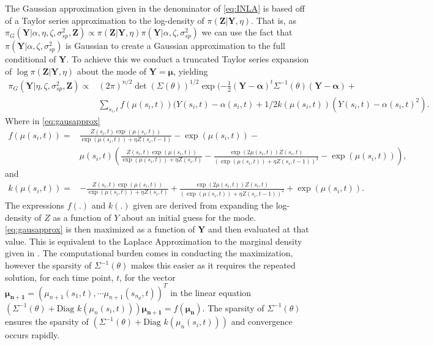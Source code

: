 \documentclass[11pt]{isuthesis}
\begin{document}
	The Gaussian approximation given in the denominator of \eqref{eq:INLA} is based off of a Taylor series approximation to the log-density of $\pi(\boldsymbol{Z}|\boldsymbol{Y},\eta)$.  That is, as $\pi_G(\boldsymbol{Y}|\alpha,\eta,\zeta,\sigma_{sp}^2,\boldsymbol{Z})\propto\pi(\boldsymbol{Z}|\boldsymbol{Y},\eta)\pi(\boldsymbol{Y}|\alpha,\zeta,\sigma_{sp}^2)$ we can use the fact that $\pi(\boldsymbol{Y}|\alpha,\zeta,\sigma_{sp}^2)$ is Gaussian to create a Gaussian approximation to the full conditional of $\boldsymbol{Y}$.  To achieve this we conduct a truncated Taylor series expansion of $\log\pi(\boldsymbol{Z}|\boldsymbol{Y},\eta)$ about the mode of $\boldsymbol{Y}=\boldsymbol{\mu}$, yielding
	\begin{align}
	\pi_G(\boldsymbol{Y}|\eta,\zeta,\sigma_{sp}^2,\boldsymbol{Z}) \propto& (2 \pi)^{n/2} \det(\Sigma(\theta))^{1/2} \exp(-\frac{1}{2}(\boldsymbol{Y}-\boldsymbol{\alpha})^t \Sigma^{-1}(\theta)(\boldsymbol{Y}-\boldsymbol{\alpha})+\nonumber \\&\sum_{s_i,t} f(\mu(s_i,t))(Y(s_i,t)-\alpha(s_i,t)+
	\label{eq:gausapprox} 1/2 k (\mu(s_i,t))(Y(s_i,t)-\alpha(s_i,t)^2).
	\end{align} 
	Where in \eqref{eq:gausapprox}
	{\small
	\begin{align}
	f(\mu(s_i,t))  =& \frac{Z(s_i,t)\exp(\mu(s_i,t))}{\exp(\mu(s_i,t))+\eta Z(s_i,t-1)}-\exp(\mu(s_i,t)) - \nonumber \\       & \mu(s_i,t)\left(\frac{Z(s_i,t)\exp(\mu(s_i,t))}{\exp(\mu(s_i,t))+\eta Z(s_i,t)}-\frac{\exp(2 \mu(s_i,t))Z(s_i,t)}{\left(\exp(\mu(s_i,t))+\eta Z(s_i,t-1)\right)^2}-\exp(\mu(s_i,t))\right),
	\end{align}
	}%
	and
	\begin{align}
	k(\mu(s_i,t)) =& -\frac{Z(s_i,t)\exp(\mu(s_i,t))}{\exp(\mu(s_i,t))+\eta Z(s_i,t)}+\frac{\exp(2 \mu(s_i,t))Z(s_i,t)}{\left(\exp(\mu(s_i,t))+\eta Z(s_i,t-1)\right)^2}+\exp(\mu(s_i,t)). 
	\end{align}
	The expressions $f(.)$ and $k(.)$ given are derived from expanding the log-density of $Z$ as a function of $Y$ about an initial guess for the mode. \eqref{eq:gausapprox} is then maximized as a function of $\boldsymbol{Y}$ and then evaluated at that value.  This is equivalent to the Laplace Approximation to the marginal density given in \cite{tierney1986accurate}.  The computational burden comes in conducting the maximization, however the sparsity of $\Sigma^{-1}(\theta)$ makes this easier as it requires the repeated solution, for each time point, $t$, for the vector $\boldsymbol{\mu_{n+1}}=(\mu_{n+1}(s_1,t),\cdots\mu_{n+1}(s_{n_d},t))^T$ in the linear equation $\left(\Sigma^{-1}(\theta)+\mbox{Diag }k(\mu_n(s_i,t))\right)\boldsymbol{\mu_{n+1}} = f(\boldsymbol{\mu_n})$.  The sparsity of $\Sigma^{-1}(\theta)$ ensures the sparsity of $\left(\Sigma^{-1}(\theta)+\mbox{Diag }k(\mu_n(s_i,t))\right)$ and convergence occurs rapidly.
	
\end{document}
